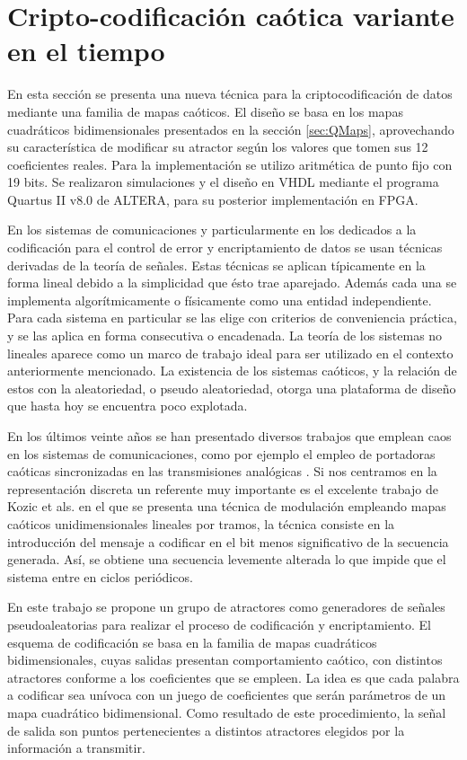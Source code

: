 \section{Cripto-codificación caótica variante en el tiempo}
\label{sec:CodCaot}

En esta sección se presenta una nueva técnica para la criptocodificación de datos mediante una familia de mapas caóticos.
El diseño se basa en los mapas cuadráticos bidimensionales presentados en la sección \ref{sec:QMaps}, aprovechando su característica de modificar su atractor según los valores que tomen sus 12 coeficientes reales.
Para la implementación se utilizo aritmética de punto fijo con 19 bits.
Se realizaron simulaciones y el diseño en VHDL mediante el programa Quartus II v8.0 de ALTERA, para su posterior implementación en FPGA.

En los sistemas de comunicaciones y particularmente en los dedicados a la codificación para el control de error y encriptamiento de datos se usan técnicas derivadas de la teoría de señales.
Estas técnicas se aplican típicamente en la forma lineal debido a la simplicidad que ésto trae aparejado.
Además cada una se implementa algorítmicamente o físicamente como una entidad independiente.
Para cada sistema en particular se las elige con criterios de conveniencia práctica, y se las aplica en forma consecutiva o encadenada.
La teoría de los sistemas no lineales \cite{Strogatz1994,Lasota1994} aparece como un marco de trabajo ideal para ser utilizado en el contexto anteriormente mencionado.
La existencia de los sistemas caóticos, y la relación de estos con la aleatoriedad, o pseudo aleatoriedad, otorga una plataforma de diseño que hasta hoy se encuentra poco explotada.

En los últimos veinte años se han presentado diversos trabajos que emplean caos en los sistemas de comunicaciones, como por ejemplo el empleo de portadoras caóticas sincronizadas en las transmisiones analógicas \cite{Kocarev1995,Hidalgo2001}.
Si nos centramos en la representación discreta un referente muy importante es el excelente trabajo de Kozic et als. \cite{Kozic2006A,Kozic2006B} en el que se presenta una técnica de modulación empleando mapas caóticos unidimensionales lineales por tramos, la técnica consiste en la introducción del mensaje a codificar en el bit menos significativo de la secuencia generada.
Así, se obtiene una secuencia levemente alterada lo que impide que el sistema entre en ciclos periódicos.

En este trabajo se propone un grupo de atractores como generadores de señales pseudoaleatorias para realizar el proceso de codificación y encriptamiento.
El esquema de codificación se basa en la familia de mapas cuadráticos bidimensionales, cuyas salidas presentan comportamiento caótico, con distintos atractores conforme a los coeficientes que se empleen.
La idea es que cada palabra a codificar sea unívoca con un juego de coeficientes que serán parámetros de un mapa cuadrático bidimensional.
Como resultado de este procedimiento, la señal de salida son puntos pertenecientes a distintos atractores elegidos por la información a transmitir.


